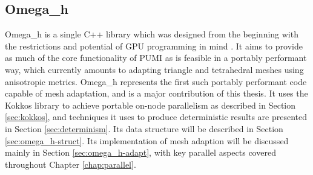 \subsection{Omega\_h}

Omega\_h is a single C++ library which was designed from the beginning
with the restrictions and potential of GPU programming in mind
\cite{osh_github}.
It aims to provide as much of the core functionality of PUMI as
is feasible in a portably performant way, which currently
amounts to adapting triangle and tetrahedral meshes using anisotropic
metrics.
Omega\_h represents the first such portably performant code capable
of mesh adaptation, and is a major contribution of this thesis.
It uses the Kokkos library to achieve portable on-node parallelism
as described in Section \ref{sec:kokkos}, and techniques
it uses to produce deterministic results are presented
in Section \ref{sec:determinism}.
Its data structure will be described in Section \ref{sec:omega_h-struct}.
Its implementation of mesh adaption will be discussed mainly
in Section \ref{sec:omega_h-adapt}, with key parallel aspects
covered throughout Chapter \ref{chap:parallel}.

